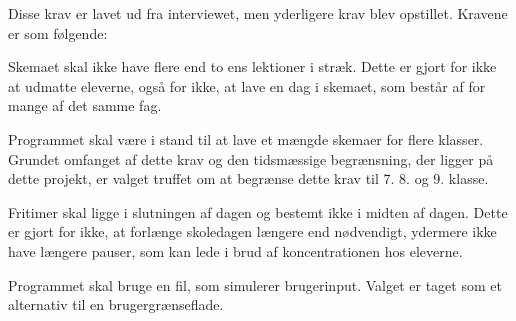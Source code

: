 Disse krav er lavet ud fra interviewet, men yderligere krav blev opstillet. Kravene er som følgende:

Skemaet skal ikke have flere end to ens lektioner i stræk. Dette er gjort for ikke at udmatte eleverne, %
 også for ikke, at lave en dag i skemaet, som består af for mange af det samme fag.

Programmet skal være i stand til at lave et mængde skemaer for flere klasser. Grundet omfanget af dette krav og den tidsmæssige begrænsning, der ligger på dette projekt, er valget truffet om at begrænse dette krav til 7. 8. og 9. klasse. 

Fritimer skal ligge i slutningen af dagen og bestemt ikke i midten af dagen. Dette er gjort for ikke, at forlænge skoledagen længere end nødvendigt, ydermere ikke have længere pauser, som kan lede i brud af koncentrationen hos eleverne.

Programmet skal bruge en fil, som simulerer brugerinput. Valget er taget som et alternativ til en brugergrænseflade.  
